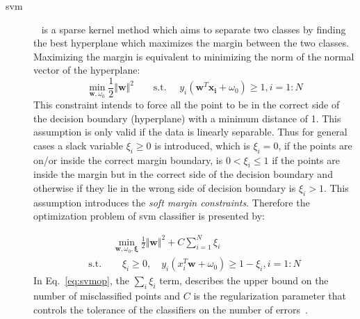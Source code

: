 \begin{description}
\item[\acf*{svm}]~\cite{vapnik1963generalized} is a sparse kernel method which aims to separate two classes by finding the best hyperplane which maximizes the margin between the two classes. 
Maximizing the margin is equivalent to minimizing the norm of the normal vector of the hyperplane: 
\begin{equation}
\min\limits_{\mathbf{w}, \omega_{0}} \frac{1}{2} \Vert \mathbf{w}\Vert^{2} \qquad \text{s.t. } \quad  y_{i}(\mathbf{w}^{T}\mathbf{x_{i}} + \omega_{0}) \geq 1, i = 1: N
\label{eq:svmsm}
\end{equation}
\noindent This constraint intends to force all the point to be in the correct side of the decision boundary (hyperplane) with a minimum distance of 1. 
This assumption is only valid if the data is linearly separable. 
Thus for general cases a slack variable $\xi_{i} \geq 0 $ is introduced, which is $\xi_{i} = 0 $, if the points are on/or inside the correct margin boundary, is $0 < \xi_{i} \leq 1 $ if the points are inside the margin but in the correct side of the decision boundary and otherwise if they lie in the wrong side of decision boundary is $\xi_{i} > 1 $. 
This assumption introduces the \textit{soft margin constraints}.
Therefore the optimization problem of \ac{svm} classifier is presented by:

\begin{align}
 & \min\limits_{\mathbf{w},\omega_{0}, \mathbf{\xi}} \frac{1}{2} \Vert \mathbf{w} \Vert^{2} + C \sum\limits_{i = 1}^{N} \xi_{i} \nonumber \\ 
\text{s.t. } & \quad \xi_{i} \geq 0, \quad y_{i}(x_{i}^{T}\mathbf{w} + \omega_{0}) \geq 1 - \xi_{i}, i = 1:N 
\label{eq:svmop}
\end{align}
In Eq.~\ref{eq:svmop}, the $\sum_{i} \xi_{i}$ term, describes the upper bound on the number of misclassified points and $C$ is the regularization parameter that controls the tolerance of the classifiers on the number of errors~\cite{murphy2012machine}. \\

\end{description}




